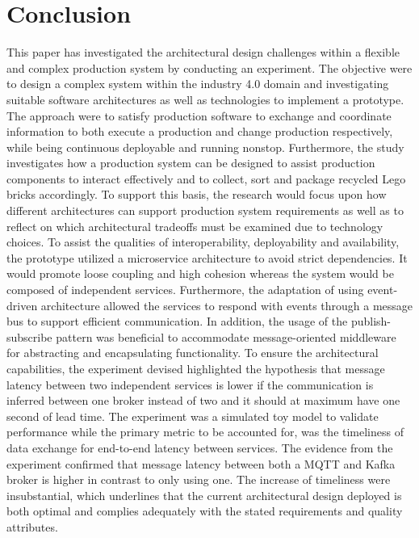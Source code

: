 \section{Conclusion}
This paper has investigated the architectural design challenges within a flexible and complex production system by conducting an experiment. The objective were to design a complex system within the industry 4.0 domain and investigating suitable software architectures as well as technologies to implement a prototype. The approach were to satisfy production software to exchange and coordinate information to both execute a production and change production respectively, while being continuous deployable and running nonstop. Furthermore, the study investigates how a production system can be designed to assist production components to interact effectively and to collect, sort and package recycled Lego bricks accordingly. To support this basis, the research would focus upon how different architectures can support production system requirements as well as to reflect on which architectural tradeoffs must be examined due to technology choices. To assist the qualities of interoperability, deployability and availability, the prototype utilized a microservice architecture to avoid strict dependencies. It would promote loose coupling and high cohesion whereas the system would be composed of independent services. Furthermore, the adaptation of using event-driven architecture allowed the services to respond with events through a message bus to support efficient communication. In addition, the usage of the publish-subscribe pattern was beneficial to accommodate message-oriented middleware for abstracting and encapsulating functionality. To ensure the architectural capabilities, the experiment devised highlighted the hypothesis that message latency between two independent services is lower if the communication is inferred between one broker instead of two and it should at maximum have one second of lead time. The experiment was a simulated toy model to validate performance while the primary metric to be accounted for, was the timeliness of data exchange for end-to-end latency between services. The evidence from the experiment confirmed that message latency between both a MQTT and Kafka broker is higher in contrast to only using one. The increase of timeliness were insubstantial, which underlines that the current architectural design deployed is both optimal and complies adequately with the stated requirements and quality attributes.